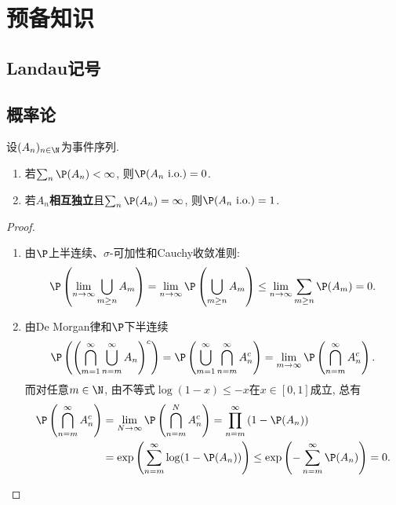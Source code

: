 \section{预备知识}

\subsection{Landau记号}

\subsection{概率论}

\begin{theorem}
	设$(A_n)_{n \in \N}$为事件序列.
	\begin{enumerate}
		\item 若$\sum_n \P(A_n) < \infty$, 则$\P(A_n \text{ i.o.} ) =0$. 
		\item 若$A_n$\textbf{相互独立}且$\sum_n \P(A_n) = \infty$, 则$\P(A_n \text{ i.o.} ) =1$.
	\end{enumerate}
\end{theorem}
\begin{proof}
	\begin{enumerate}
		\item 由$\P$上半连续、$\sigma$-可加性和Cauchy收敛准则: 
		\begin{equation*} 
			\P\left(\lim_{n \to \infty} \bigcup_{m \geq n} A_m\right) 
			= \lim_{n \to \infty} \P \left(\bigcup_{m \geq n} A_m\right) 
			\leq \lim_{n \to \infty} \sum_{m \geq n} \P(A_m) = 0. 
		\end{equation*}
		\item 由De Morgan律和$\P$下半连续
		\begin{equation*}
			\P \left( \left(\bigcap_{m=1}^{\infty} \bigcup_{n=m}^{\infty} A_n \right)^c \right)
			= \P \left( \bigcup_{m=1}^{\infty} \bigcap_{n=m}^{\infty} A_n^c \right) 
			= \lim_{m \to \infty} \P\left( \bigcap_{n=m}^{\infty} A_n^c \right).
		\end{equation*}
		而对任意$m \in \N$, 由不等式$\log(1-x) \leq -x$在$x \in [0,1]$成立, 总有
		\begin{align*}
			\P \left( \bigcap_{n=m}^{\infty} A_n^c \right) 
			&= \lim_{N \to \infty} \P \left( \bigcap_{n=m}^{N} A_n^c \right) 
			= \prod_{n=m}^{\infty} \left( 1 - \P(A_n) \right) \\
			&= \exp\left( \sum_{n=m}^{\infty} \log(1-\P(A_n)) \right)
			\leq \exp\left(- \sum_{n=m}^{\infty} \P(A_n) \right) 
			= 0. 
		\end{align*}
	\end{enumerate}
\end{proof}


